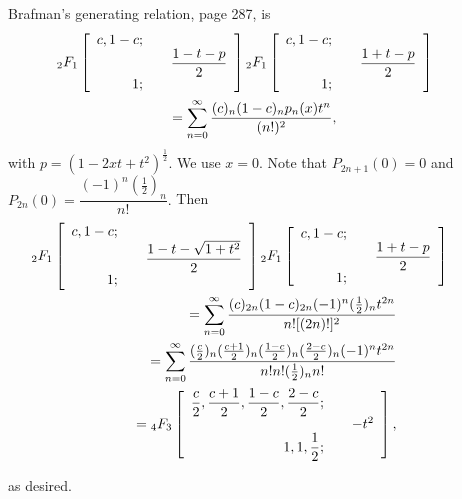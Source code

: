 \begin{solution}
Brafman's generating relation, page 287, is
\begin{eqnarray*}
\lefteqn{\!\!\!\!\!\!\!\!\!\!\!\!\!\!\!\!\!\!\!\!\!\!\!\!\!\!\!\!\!\!\!\!\!\!\!\!\!\!\!\!\!\!\!\!\!\!\!\!{}_2F_1 \left[ \begin{array}{rlr}
c, 1-c; & & \\
& & \dfrac{1-t-p}{2} \\
1; & &
\end{array} \right] {}_2F_1 \left[ \begin{array}{rlr}
c, 1-c; & & \\
& & \dfrac{1+t-p}{2} \\
1; & &
\end{array} \right]} \\
& = \displaystyle\sum_{n=0}^{\infty} \dfrac{(c)_n (1-c)_n p_n(x) t^n}{(n!)^2},
\end{eqnarray*}
with $p=(1-2xt+t^2)^{\frac{1}{2}}$. We use $x=0$. Note that $P_{2n+1}(0)=0$ and $P_{2n}(0) = \dfrac{(-1)^n (\frac{1}{2})_n}{n!}.$ Then
\begin{eqnarray*}
\lefteqn{\!\!\!\!\!\!\!\!\!\!\!\!\!\!\!\!\!\!\!\!\!\!\!\!\!\!\!\!\!\!\!\!\!\!\!\!\!\!\!{}_2F_1 \left[ \begin{array}{rlr}
c, 1-c; & & \\
& & \dfrac{1-t-\sqrt{1+t^2}}{2} \\
1; & & 
\end{array} \right] {}_2F_1 \left[ \begin{array}{rlr}
c, 1-c; & & \\
& & \dfrac{1+t-p}{2} \\
1; & &
\end{array} \right]} \\
& &= \displaystyle\sum_{n=0}^{\infty} \dfrac{(c)_{2n} (1-c)_{2n} (-1)^n (\frac{1}{2})_n t^{2n}}{n! [(2n)!]^2} \\
&&= \displaystyle\sum_{n=0}^{\infty} \dfrac{(\frac{c}{2})_n (\frac{c+1}{2})_n (\frac{1-c}{2})_n (\frac{2-c}{2})_n (-1)^n t^{2n}}{n! n! (\frac{1}{2})_n n!} \\
&&= {}_4F_3 \left[ \begin{array}{rlr}
\dfrac{c}{2}, \dfrac{c+1}{2}, \dfrac{1-c}{2}, \dfrac{2-c}{2}; & & \\
& & -t^2 \\
1, 1, \dfrac{1}{2}; & &
\end{array} \right],
\end{eqnarray*}

as desired.
\end{solution}
